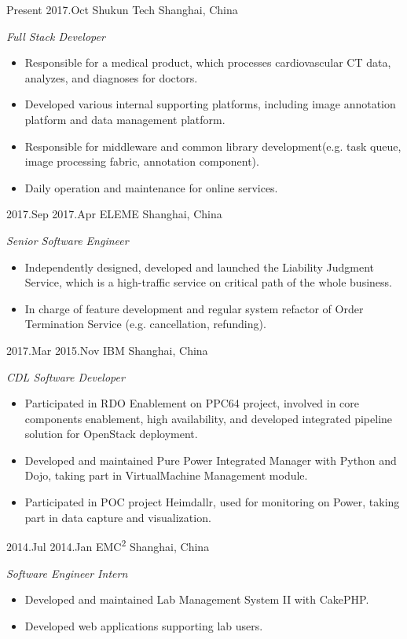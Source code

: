 \documentclass[]{friggeri-cv} %
\begin{document}
\begin{entrylist}

	\entry
	{Present}
	{2017.Oct}
	{Shukun Tech}
	{Shanghai, China}
	{\emph{Full Stack Developer}
		\begin{itemize}
			\item Responsible for a medical product, which processes cardiovascular CT data, analyzes, and diagnoses for doctors.
			\item Developed various internal supporting platforms, including image annotation platform and data management platform.
			\item Responsible for middleware and common library development(e.g. task queue, image processing fabric, annotation component).
			\item Daily operation and maintenance for online services.
		\end{itemize}
	}
	
	\entry
	{2017.Sep}
	{2017.Apr}
	{ELEME}
	{Shanghai, China}
	{\emph{Senior Software Engineer}
		\begin{itemize}
			\item Independently designed, developed and launched the Liability Judgment Service, which is a high-traffic service on critical path of the whole business.
			\item In charge of feature development and regular system refactor of Order Termination Service (e.g. cancellation, refunding).
		\end{itemize}
	}
	
	\entry
	{2017.Mar}
	{2015.Nov}
	{IBM}
	{Shanghai, China}
	{\emph{CDL Software Developer}
		\begin{itemize}
		   \item Participated in RDO Enablement on PPC64 project, involved in core components enablement, high availability, and developed integrated pipeline solution for OpenStack deployment.
			\item Developed and maintained Pure Power Integrated Manager with Python and Dojo, taking part in VirtualMachine Management module.
			\item Participated in POC project Heimdallr, used for monitoring on Power, taking part in data capture and visualization.
		\end{itemize}
	}
	
	\entry
	{2014.Jul}
	{2014.Jan}
	{EMC\textsuperscript{2}}
	{Shanghai, China}
	{\emph{Software Engineer Intern}
		\begin{itemize}
			\item Developed and maintained Lab Management System II with CakePHP.
			\item Developed web applications supporting lab users.
		\end{itemize}
	}
	

\end{entrylist}
\end{document}
